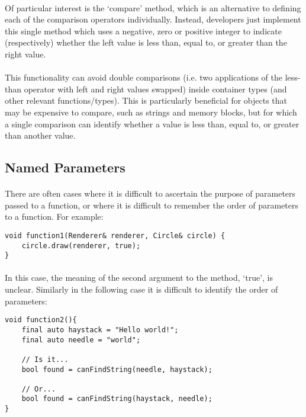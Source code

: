 \documentclass[12pt,twoside,notitlepage]{report}
\begin{document}
\paragraph{}
Of particular interest is the `compare' method, which is an alternative to defining each of the comparison operators individually. Instead, developers just implement this single method which uses a negative, zero or positive integer to indicate (respectively) whether the left value is less than, equal to, or greater than the right value.

\paragraph{}
This functionality can avoid double comparisons (i.e. two applications of the less-than operator with left and right values swapped) inside container types (and other relevant functions/types). This is particularly beneficial for objects that may be expensive to compare, such as strings and memory blocks, but for which a single comparison can identify whether a value is less than, equal to, or greater than another value.

\clearpage

\subsection{Named Parameters}

\paragraph{}
There are often cases where it is difficult to ascertain the purpose of parameters passed to a function, or where it is difficult to remember the order of parameters to a function. For example:

\begin{lstlisting}
void function1(Renderer& renderer, Circle& circle) {
	circle.draw(renderer, true);
}
\end{lstlisting}

\paragraph{}
In this case, the meaning of the second argument to the method, `true', is unclear. Similarly in the following case it is difficult to identify the order of parameters:

\begin{lstlisting}
void function2(){
	final auto haystack = "Hello world!";
	final auto needle = "world";
	
	// Is it...
	bool found = canFindString(needle, haystack);
	
	// Or...
	bool found = canFindString(haystack, needle);
}
\end{lstlisting}
\end{document}
